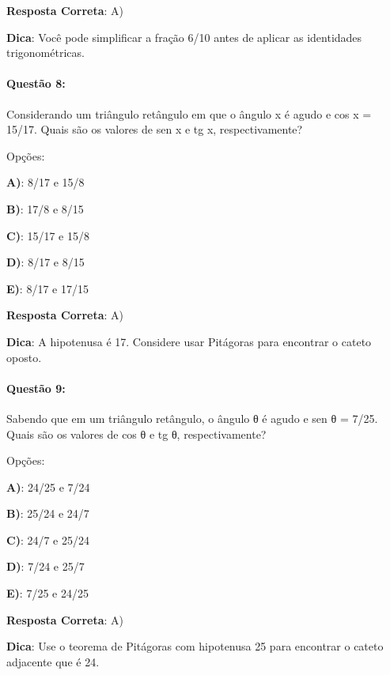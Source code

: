 \documentclass{article}
\begin{document}
\vspace{\baselineskip}\textbf{Resposta Correta}: A)

\vspace{\baselineskip}\textbf{Dica}: Você pode simplificar a fração 6/10 antes de aplicar as identidades trigonométricas.

\paragraph{Questão 8:}
{Considerando um triângulo retângulo em que o ângulo x é agudo e cos x = 15/17. Quais são os valores de sen x e tg x, respectivamente?}

\vspace{\baselineskip}Opções:

\vspace{\baselineskip}\textbf{A)}: 8/17 e 15/8 

\textbf{B)}: 17/8 e 8/15 

\textbf{C)}: 15/17 e 15/8 

\textbf{D)}: 8/17 e 8/15 

\textbf{E)}: 8/17 e 17/15 

\vspace{\baselineskip}\textbf{Resposta Correta}: A)

\vspace{\baselineskip}\textbf{Dica}: A hipotenusa é 17. Considere usar Pitágoras para encontrar o cateto oposto.

\paragraph{Questão 9:}
{Sabendo que em um triângulo retângulo, o ângulo θ é agudo e sen θ = 7/25. Quais são os valores de cos θ e tg θ, respectivamente?}

\vspace{\baselineskip}Opções:

\vspace{\baselineskip}\textbf{A)}: 24/25 e 7/24 

\textbf{B)}: 25/24 e 24/7 

\textbf{C)}: 24/7 e 25/24 

\textbf{D)}: 7/24 e 25/7 

\textbf{E)}: 7/25 e 24/25 

\vspace{\baselineskip}\textbf{Resposta Correta}: A)

\vspace{\baselineskip}\textbf{Dica}: Use o teorema de Pitágoras com hipotenusa 25 para encontrar o cateto adjacente que é 24.
\end{document}
